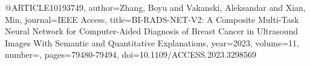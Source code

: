 @ARTICLE{10193749,
  author={Zhang, Boyu and Vakanski, Aleksandar and Xian, Min},
  journal={IEEE Access}, 
  title={BI-RADS-NET-V2: A Composite Multi-Task Neural Network for Computer-Aided Diagnosis of Breast Cancer in Ultrasound Images With Semantic and Quantitative Explanations}, 
  year={2023},
  volume={11},
  number={},
  pages={79480-79494},
  doi={10.1109/ACCESS.2023.3298569}}
